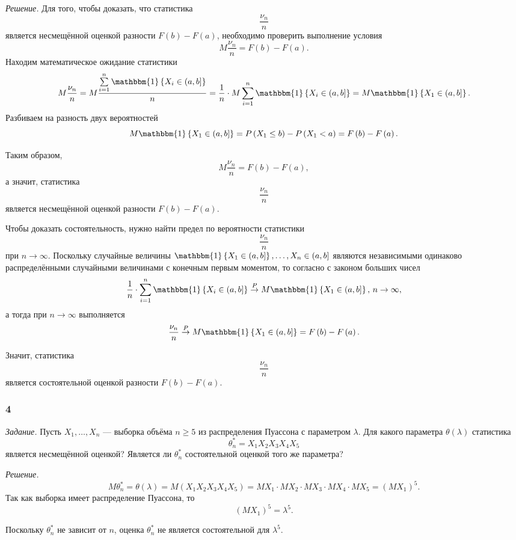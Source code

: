 \textit{Решение.} Для того, чтобы доказать, что статистика
$$ \frac{ \nu_n}{n}$$
является несмещённой оценкой разности $F \left( b \right) - F \left( a \right) $,
необходимо проверить выполнение условия
$$M \frac{ \nu_n}{n} =
  F \left( b \right) - F \left( a \right).$$
Находим математическое ожидание статистики
$$M \frac{ \nu_n}{n} =
  M \frac{ \sum \limits_{i = 1}^n \mathbbm{1} \left\{ X_i \in \left( a, b \right] \right\} }{n} =
  \frac{1}{n} \cdot
  M \sum \limits_{i = 1}^n \mathbbm{1} \left\{ X_i \in \left( a, b \right] \right\} =
  M \mathbbm{1} \left\{ X_1 \in \left( a, b \right] \right\}.$$
Разбиваем на разность двух вероятностей
$$M \mathbbm{1} \left\{ X_1 \in \left( a, b \right] \right\} =
  P \left( X_1 \leq b \right) - P \left( X_1 < a \right) =
  F \left( b \right) - F \left( a \right).$$

Таким образом,
$$M \frac{ \nu_n}{n} =
  F \left( b \right) - F \left( a \right),$$
а значит, статистика
$$ \frac{ \nu_n}{n}$$
является несмещённой оценкой разности $F \left( b \right) - F \left( a \right) $.

Чтобы доказать состоятельность, нужно найти предел по вероятности статистики
$$ \frac{ \nu_n}{n}$$
при $n \to \infty $.
Поскольку случайные величины
$ \mathbbm{1} \left\{ X_1 \in \left( a, b \right] \right\}, \dotsc,
  X_n \in \left( a, b \right] $
являются независимыми одинаково распределёнными случайными величинами с конечным первым моментом,
то согласно с законом больших чисел
$$ \frac{1}{n} \cdot
  \sum \limits_{i = 1}^n
    \mathbbm{1} \left\{ X_i \in \left( a, b \right] \right\} \overset{P}{ \rightarrow}
  M \mathbbm{1} \left\{ X_1 \in \left( a, b \right] \right\}, \,
  n \to \infty,$$
а тогда при $n \to \infty $ выполняется
$$ \frac{ \nu_n}{n} \overset{P}{ \rightarrow }
  M \mathbbm{1} \left\{ X_1 \in \left( a, b \right] \right\} =
  F \left( b \right) - F \left( a \right).$$

Значит, статистика
$$ \frac{ \nu_n}{n}$$
является состоятельной оценкой разности $F \left( b \right) - F \left( a \right) $.

\subsubsection*{4}

\textit{Задание.}
Пусть $X_1, \dotsc, X_n$ ---
выборка объёма $n \geq 5$ из распределения Пуассона с параметром $ \lambda $.
Для какого параметра $ \theta \left( \lambda \right) $ статистика
$$ \theta_n^* =
  X_1 X_2 X_3 X_4 X_5$$
является несмещённой оценкой?
Является ли $ \theta_n^*$ состоятельной оценкой того же параметра?

\textit{Решение.}
$$M \theta_n^* =
  \theta \left( \lambda \right) =
  M \left( X_1 X_2 X_3 X_4 X_5 \right) =
  MX_1 \cdot MX_2 \cdot MX_3 \cdot MX_4 \cdot MX_5 =
  \left( MX_1 \right)^5.$$
Так как выборка имеет распределение Пуассона, то
$$ \left( MX_1 \right)^5 =
  \lambda^5.$$

Поскольку $ \theta_n^*$ не зависит от $n$,
оценка $ \theta_n^*$ не является состоятельной для $ \lambda^5$.
